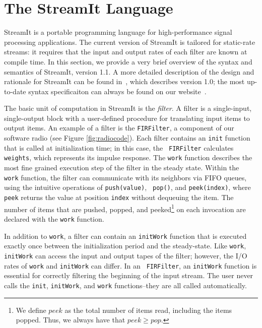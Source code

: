 \section{The StreamIt Language}
\label{sec:streamit}

StreamIt is a portable programming language for high-performance
signal processing applications.  The current version of StreamIt is
tailored for static-rate streams: it requires that the input and
output rates of each filter are known at compile time.  In this
section, we provide a very brief overview of the syntax and semantics
of StreamIt, version 1.1.  A more detailed description of the design
and rationale for StreamIt can be found in~\cite{streamitcc}, which
describes version 1.0; the most up-to-date syntax specificaiton can
always be found on our website~\cite{streamitweb}.

The basic unit of computation in StreamIt is the {\it filter}.  A
filter is a single-input, single-output block with a user-defined
procedure for translating input items to output items.  An example of
a filter is the {\tt FIRFilter}, a component of our software radio
(see Figure \ref{fig:radiocode}).  Each filter contains an {\tt init}
function that is called at initialization time; in this case, the {\tt
FIRFilter} calculates {\tt weights}, which represents its impulse
response.  The {\tt work} function describes the most fine grained
execution step of the filter in the steady state.  Within the {\tt
work} function, the filter can communicate with its neighbors via FIFO
queues, using the intuitive operations of {\tt push(value)}, {\tt
pop()}, and {\tt peek(index)}, where {\tt peek} returns the value at
position {\tt index} without dequeuing the item.  The number of items
that are pushed, popped, and peeked\footnote{We define $peek$ as the
total number of items read, including the items popped.  Thus, we
always have that $peek \ge pop$.} on each invocation are declared with
the {\tt work} function.

In addition to {\tt work}, a filter can contain an {\tt initWork}
function that is executed exactly once between the initialization
period and the steady-state.  Like {\tt work}, {\tt initWork} can
access the input and output tapes of the filter; however, the I/O
rates of {\tt work} and {\tt initWork} can differ.  In an {\tt
FIRFilter}, an {\tt initWork} function is essential for correctly
filtering the beginning of the input stream.  The user never calls the
{\tt init}, {\tt initWork}, and {\tt work} functions--they are all
called automatically.


